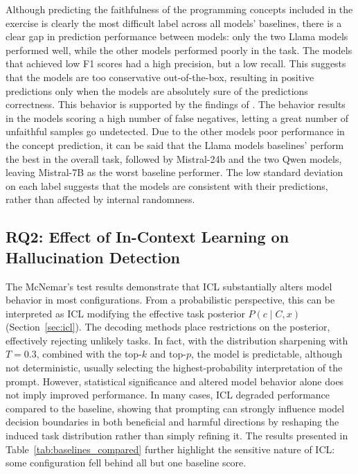 \documentclass[english, 12pt, a4paper, sci, utf8, a-2b, online]{latex/definitions/aaltothesis}
\begin{document}
Although predicting the faithfulness of the programming concepts included in the exercise is clearly the most difficult label across all models' baselines, there is a clear gap in prediction performance between models: only the two Llama models performed well, while the other models performed poorly in the task. The models that achieved low F1 scores had a high precision, but a low recall. This suggests that the models are too conservative out-of-the-box, resulting in positive predictions only when the models are absolutely sure of the predictions correctness. This behavior is supported by the findings of \textcite{rahman2026conceptcoderimprovecodereasoning}. The behavior results in the models scoring a high number of false negatives, letting a great number of unfaithful samples go undetected. Due to the other models poor performance in the concept prediction, it can be said that the Llama models baselines' perform the best in the overall task, followed by Mistral-24b and the two Qwen models, leaving Mistral-7B as the worst baseline performer. The low standard deviation on each label suggests that the models are consistent with their predictions, rather than affected by internal randomness. 

\subsection{RQ2: Effect of In-Context Learning on Hallucination Detection} \label{sec:discussion_rq2}

The McNemar's test results demonstrate that ICL substantially alters model behavior in most configurations. From a probabilistic perspective, this can be interpreted as ICL modifying the effective task posterior $P(c \mid C, x)$ (Section~\ref{sec:icl}). The decoding methods place restrictions on the posterior, effectively rejecting unlikely tasks. In fact, with the distribution sharpening with $T=0.3$, combined with the top-$k$ and top-$p$, the model is predictable, although not deterministic, usually selecting the highest-probability interpretation of the prompt. However, statistical significance and altered model behavior alone does not imply improved performance. In many cases, ICL degraded performance compared to the baseline, showing that prompting can strongly influence model decision boundaries in both beneficial and harmful directions by reshaping the induced task distribution rather than simply refining it. The results presented in Table~\ref{tab:baselines_compared} further highlight the sensitive nature of ICL: some configuration fell behind all but one baseline score. 
\end{document}
